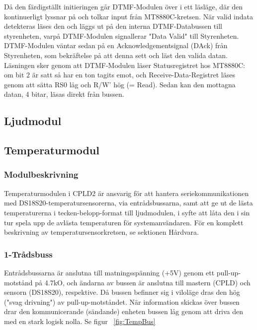 \documentclass[a4paper,11pt]{article}
\begin{document}
	Då den färdigställt initieringen går DTMF-Modulen över i ett läsläge, där den kontinuerligt lyssnar på och
	tolkar input från MT8880C-kretsen. När valid indata detekteras läses den och läggs ut på den interna
	DTMF-Databussen till styrenheten, varpå DTMF-Modulen signallerar "Data Valid" till Styrenheten. DTMF-Modulen
	väntar sedan på en Acknowledgementsignal (DAck) från Styrenheten, som bekräftelse på att denna sett och läst
	den valida datan. Läsningen sker genom att DTMF-Modulen läser Statusregistret hos MT8880C: om bit 2 är satt
	så har en ton tagits emot, och Receive-Data-Registret läses genom att sätta RS0 låg och R/W' hög (= Read).
	Sedan kan den mottagna datan, 4 bitar, läsas direkt från bussen.

	\subsection{Ljudmodul}

	\subsection{Temperaturmodul}

	\subsubsection{Modulbeskrivning}

	Temperaturmodulen i CPLD2 är ansvarig för att hantera seriekommunikationen med 
	DS18S20-temperatursensorerna, via entrådsbussarna, samt att ge ut de lästa temperaturerna
	i tecken-belopp-format till ljudmodulen, i syfte att låta den i sin tur spela upp de avlästa
	temperaturen för systemanvändaren. För en komplett beskrivning av temperatursensorkretsen, se sektionen Hårdvara.

	\subsubsection{1-Trådsbuss}

	Entrådsbussarna är anslutna till matningsspänning (+5V) genom ett pull-up-motstånd på 4.7kO, och
	ändarna av bussen är anslutna till mastern (CPLD) och sensorn (DS18S20), respektive. Då bussen
	befinner sig i viloläge dras den hög ("svag drivning") av pull-up-motståndet. När information
	skickas över bussen drar den kommunicerande (sändande) enheten bussen låg genom att driva den
	med en stark logisk nolla. Se figur ~\ref{fig:TempBus}
\end{document}
